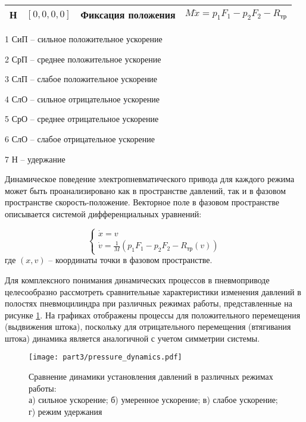 \begin{table}[htbp]
\begin{tabular}{lcll}
		\hline
		Н                        & $[0,0,0,0]$         &
		Фиксация положения       &
		$M\ddot{x} = p_1F_1 - p_2F_2 - R_\text{тр}$                                            \\
		\midrule
	\end{tabular}
	\begin{tablenotes}
		\scriptsize
		\item[1] СиП -- сильное положительное ускорение
		\item[2] СрП -- среднее положительное ускорение
		\item[3] СлП -- слабое положительное ускорение
		\item[4] СлО -- сильное отрицательное ускорение
		\item[5] СрО -- среднее отрицательное ускорение
		\item[6] СлО -- слабое отрицательное ускорение
		\item[7] Н -- удержание
	\end{tablenotes}
\end{table}

Динамическое поведение электропневматического привода для каждого режима может быть
проанализировано как в пространстве давлений, так и в фазовом пространстве
скорость-положение. Векторное поле в фазовом пространстве описывается системой дифференциальных уравнений:

\begin{equation*}
	\begin{cases}
		\dot{x} = v \\
		\dot{v} = \frac{1}{M}(p_1F_1 - p_2F_2 - R_\text{тр}(v))
	\end{cases}
\end{equation*}
где $(x,v)$ -- координаты точки в фазовом пространстве.

Для комплексного понимания динамических процессов в пневмоприводе целесообразно рассмотреть
сравнительные характеристики изменения давлений в полостях пневмоцилиндра
при различных режимах работы, представленные на рисунке \ref{fig:pressure_comparison}.
На графиках отображены процессы для положительного перемещения (выдвижения штока),
поскольку для отрицательного перемещения (втягивания штока) динамика является аналогичной с учетом симметрии системы.

\begin{figure}[htbp]
	\centering
	\texttt{[image: part3/pressure\_dynamics.pdf]}
	\caption{Сравнение динамики установления давлений в различных режимах работы:\\
		а) сильное ускорение; б) умеренное ускорение; в) слабое ускорение; г) режим удержания}
	\label{fig:pressure_comparison}
\end{figure}

